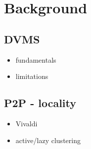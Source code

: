 \section{Background}


\subsection{DVMS}


\begin{itemize}
	
	\item fundamentals

	\item limitations

\end{itemize}







\subsection{P2P - locality}

\begin{itemize}
	
	\item Vivaldi

	\item active/lazy clustering

\end{itemize}